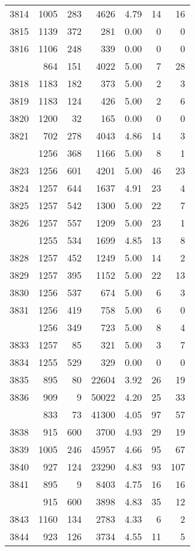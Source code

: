 \documentclass[
]{article}
\begin{document}
\begin{table}
\begin{tabular}[t]{lrrrrrr}
3814 & 1005 & 283 & 4626 & 4.79 & 14 & 16\\
3815 & 1139 & 372 & 281 & 0.00 & 0 & 0\\
3816 & 1106 & 248 & 339 & 0.00 & 0 & 0\\
\addlinespace
3817 & 864 & 151 & 4022 & 5.00 & 7 & 28\\
3818 & 1183 & 182 & 373 & 5.00 & 2 & 3\\
3819 & 1183 & 124 & 426 & 5.00 & 2 & 6\\
3820 & 1200 & 32 & 165 & 0.00 & 0 & 0\\
3821 & 702 & 278 & 4043 & 4.86 & 14 & 3\\
\addlinespace
3822 & 1256 & 368 & 1166 & 5.00 & 8 & 1\\
3823 & 1256 & 601 & 4201 & 5.00 & 46 & 23\\
3824 & 1257 & 644 & 1637 & 4.91 & 23 & 4\\
3825 & 1257 & 542 & 1300 & 5.00 & 22 & 7\\
3826 & 1257 & 557 & 1209 & 5.00 & 23 & 1\\
\addlinespace
3827 & 1255 & 534 & 1699 & 4.85 & 13 & 8\\
3828 & 1257 & 452 & 1249 & 5.00 & 14 & 2\\
3829 & 1257 & 395 & 1152 & 5.00 & 22 & 13\\
3830 & 1256 & 537 & 674 & 5.00 & 6 & 3\\
3831 & 1256 & 419 & 758 & 5.00 & 6 & 0\\
\addlinespace
3832 & 1256 & 349 & 723 & 5.00 & 8 & 4\\
3833 & 1257 & 85 & 321 & 5.00 & 3 & 7\\
3834 & 1255 & 529 & 329 & 0.00 & 0 & 0\\
3835 & 895 & 80 & 22604 & 3.92 & 26 & 19\\
3836 & 909 & 9 & 50022 & 4.20 & 25 & 33\\
\addlinespace
3837 & 833 & 73 & 41300 & 4.05 & 97 & 57\\
3838 & 915 & 600 & 3700 & 4.93 & 29 & 19\\
3839 & 1005 & 246 & 45957 & 4.66 & 95 & 67\\
3840 & 927 & 124 & 23290 & 4.83 & 93 & 107\\
3841 & 895 & 9 & 8403 & 4.75 & 16 & 16\\
\addlinespace
3842 & 915 & 600 & 3898 & 4.83 & 35 & 12\\
3843 & 1160 & 134 & 2783 & 4.33 & 6 & 2\\
3844 & 923 & 126 & 3734 & 4.55 & 11 & 5\\

\end{tabular}
\end{table}
\end{document}
